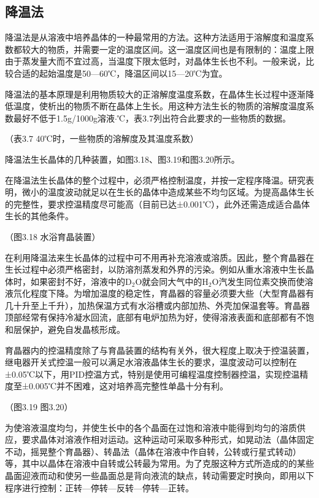 ﻿\subsection{降温法}
降温法是从溶液中培养晶体的一种最常用的方法。这种方法适用于溶解度和温度系数都较大的物质，并需要一定的温度区间。这一温度区间也是有限制的：温度上限由于蒸发量大而不宜过高，当温度下限太低时，对晶体生长也不利。一般来说，比较合适的起始温度是50---60℃，降温区间以15---20℃为宜。

降温法的基本原理是利用物质较大的正溶解度温度系数，在晶体生长过程中逐渐降低温度，使析出的物质不断在晶体上生长。用这种方法生长的物质的溶解度温度系数最好不低于1.5g/1000g溶液$\cdot$℃，表3.7列出符合此要求的一些物质的数据。

（表3.7  40℃时，一些物质的溶解度及其温度系数）

降温法生长晶体的几种装置，如图3.18、图3.19和图3.20所示。

在降温法生长晶体的整个过程中，必须严格控制温度，并按一定程序降温。研究表明，微小的温度波动就足以在生长的晶体中造成某些不均匀区域。为提高晶体生长的完整性，要求控温精度尽可能高（目前已达±0.001℃），此外还需造成适合晶体生长的其他条件。

（图3.18  水浴育晶装置）

在利用降温法来生长晶体的过程中可不用再补充溶液或溶质。因此，整个育晶器在生长过程中必须严格密封，以防溶剂蒸发和外界的污染。例如从重水溶液中生长晶体时，如果密封不好，溶液中的D$_2$O就会同大气中的H$_2$O汽发生同位素交换而使溶液氘化程度下降。为增加温度的稳定性，育晶器的容量必须要大些（大型育晶器有几十升至上千升），加热保温方式有水浴槽或内部加热、外壳加保温套等。育晶器顶部经常有保持冷凝水回流，底部有电炉加热为好，使得溶液表面和底部都有不饱和层保护，避免自发晶核形成。

育晶器内的控温精度除了与育晶装置的结构有关外，很大程度上取决于控温装置，继电器开关式控温一般可以满足水溶液晶体生长的要求，温度波动可以控制在±0.05℃以下，用PID控温方式，特别是使用可编程温度控制器控温，实现控温精度至±0.005℃并不困难，这对培养高完整性单晶十分有利。

（图3.19 图3.20）

为使溶液温度均匀，并使生长中的各个晶面在过饱和溶液中能得到均匀的溶质供应，要求晶体对溶液作相对运动。这种运动可采取多种形式，如晃动法（晶体固定不动，摇晃整个育晶器）、转晶法（晶体在溶液中作自转，公转或行星式转动）等，其中以晶体在溶液中自转或公转最为常用。为了克服这种方式所造成的的某些晶面迎液而动和使另一些晶面总是背向液流的缺点，转动需要定时换向，即用以下程序进行控制：正转---停转---反转---停转---正转。

